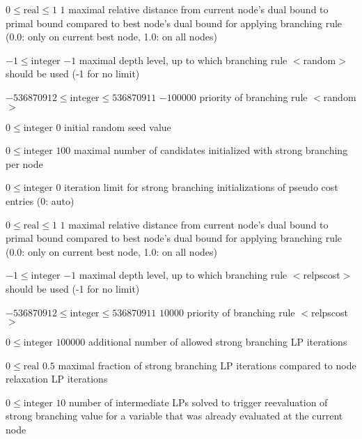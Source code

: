 %
{$0\leq\textrm{real}\leq1$}%
{$1$}%
{maximal relative distance from current node's dual bound to primal bound compared to best node's dual bound for applying branching rule (0.0: only on current best node, 1.0: on all nodes)}%
{}

%
{$-1\leq\textrm{integer}$}%
{$-1$}%
{maximal depth level, up to which branching rule $<$random$>$ should be used (-1 for no limit)}%
{}

%
{$-536870912\leq\textrm{integer}\leq536870911$}%
{$-100000$}%
{priority of branching rule $<$random$>$}%
{}

%
{$0\leq\textrm{integer}$}%
{$0$}%
{initial random seed value}%
{}

%
{$0\leq\textrm{integer}$}%
{$100$}%
{maximal number of candidates initialized with strong branching per node}%
{}

%
{$0\leq\textrm{integer}$}%
{$0$}%
{iteration limit for strong branching initializations of pseudo cost entries (0: auto)}%
{}

%
{$0\leq\textrm{real}\leq1$}%
{$1$}%
{maximal relative distance from current node's dual bound to primal bound compared to best node's dual bound for applying branching rule (0.0: only on current best node, 1.0: on all nodes)}%
{}

%
{$-1\leq\textrm{integer}$}%
{$-1$}%
{maximal depth level, up to which branching rule $<$relpscost$>$ should be used (-1 for no limit)}%
{}

%
{$-536870912\leq\textrm{integer}\leq536870911$}%
{$10000$}%
{priority of branching rule $<$relpscost$>$}%
{}

%
{$0\leq\textrm{integer}$}%
{$100000$}%
{additional number of allowed strong branching LP iterations}%
{}

%
{$0\leq\textrm{real}$}%
{$0.5$}%
{maximal fraction of strong branching LP iterations compared to node relaxation LP iterations}%
{}

%
{$0\leq\textrm{integer}$}%
{$10$}%
{number of intermediate LPs solved to trigger reevaluation of strong branching value for a variable that was already evaluated at the current node}%
{}


